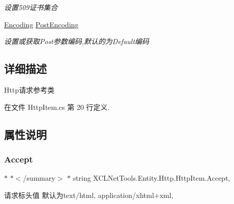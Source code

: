 \begin{DoxyCompactItemize}
\begin{DoxyCompactList}\small\item\em 设置509证书集合 \end{DoxyCompactList}\item 
\hyperlink{class_x_c_l_net_tools_1_1_entity_1_1_http_1_1_http_item_aefaad52c96c7c2b692f3470b61cd75eb}{Encoding} \hyperlink{class_x_c_l_net_tools_1_1_entity_1_1_http_1_1_http_item_ab4d3010b05811df9360aa8651d02302a}{Post\+Encoding}
\begin{DoxyCompactList}\small\item\em 设置或获取\+Post参数编码,默认的为\+Default编码 \end{DoxyCompactList}\end{DoxyCompactItemize}


\subsection{详细描述}
Http请求参考类 



在文件 Http\+Item.\+cs 第 20 行定义.



\subsection{属性说明}
\mbox{\label{class_x_c_l_net_tools_1_1_entity_1_1_http_1_1_http_item_a1e43938a270466cf6955b4e161cf25fc}} 
\subsubsection{\texorpdfstring{Accept}{Accept}}
{\footnotesize\ttfamily $\ast$ $\ast$$<$/summary$>$ $\ast$ string X\+C\+L\+Net\+Tools.\+Entity.\+Http.\+Http\+Item.\+Accept\hspace{0.3cm}{\ttfamily [get]}, {\ttfamily [set]}}



请求标头值 默认为text/html, application/xhtml+xml, 



